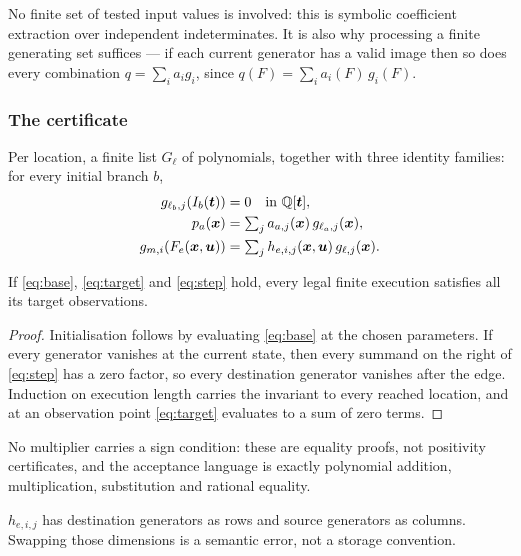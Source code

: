 No finite set of tested input values is involved: this is symbolic coefficient
extraction over independent indeterminates. It is also why processing a finite
generating set suffices --- if each current generator has a valid image then so
does every combination $q=\sum_i a_ig_i$, since
$q(F)=\sum_i a_i(F)\,g_i(F)$.

\subsubsection*{The certificate}

Per location, a finite list $G_\ell$ of polynomials, together with three
identity families: for every initial branch $b$,
\begin{align}
 g_{\ell_b,j}(I_b(\bm t))&=0 \quad\text{in }\mathbb{Q}[\bm t], \label{eq:base}\\
 p_a(\bm x)&=\textstyle\sum_j a_{a,j}(\bm x)\,g_{\ell_a,j}(\bm x),
   \label{eq:target}\\
 g_{m,i}(F_e(\bm x,\bm u))
   &=\textstyle\sum_j h_{e,i,j}(\bm x,\bm u)\,g_{\ell,j}(\bm x). \label{eq:step}
\end{align}

\begin{theorem}
\label{thm:ideal-sound}
If \eqref{eq:base}, \eqref{eq:target} and \eqref{eq:step} hold, every legal
finite execution satisfies all its target observations.
\end{theorem}
\begin{proof}
Initialisation follows by evaluating \eqref{eq:base} at the chosen parameters.
If every generator vanishes at the current state, then every summand on the
right of \eqref{eq:step} has a zero factor, so every destination generator
vanishes after the edge. Induction on execution length carries the invariant to
every reached location, and at an observation point \eqref{eq:target} evaluates
to a sum of zero terms.
\end{proof}

No multiplier carries a sign condition: these are equality proofs, not
positivity certificates, and the acceptance language is exactly polynomial
addition, multiplication, substitution and rational equality.

\begin{remark}
$h_{e,i,j}$ has destination generators as rows and source generators as
columns. Swapping those dimensions is a semantic error, not a storage
convention.
\end{remark}

